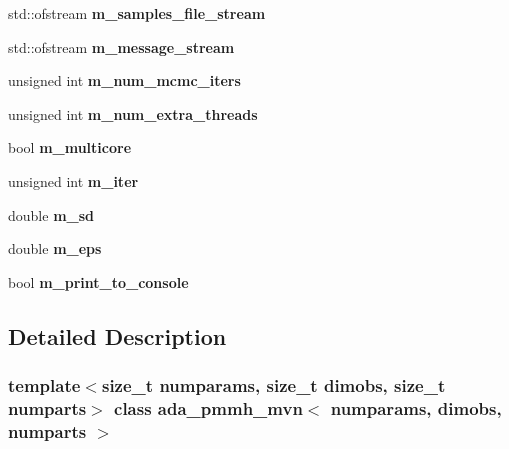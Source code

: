 \begin{DoxyCompactItemize}
\mbox{\label{classada__pmmh__mvn_ac8db545c9725213921bd4db1592d52f5}} 
std\+::ofstream {\bfseries m\+\_\+samples\+\_\+file\+\_\+stream}
\item 
\mbox{\label{classada__pmmh__mvn_a342db33e2e488aeefd818db9ad88b7c0}} 
std\+::ofstream {\bfseries m\+\_\+message\+\_\+stream}
\item 
\mbox{\label{classada__pmmh__mvn_afa1052465ed3881ee73427e2dcefcad4}} 
unsigned int {\bfseries m\+\_\+num\+\_\+mcmc\+\_\+iters}
\item 
\mbox{\label{classada__pmmh__mvn_ad6d00a88a8f8c21cedb17dc191b8180b}} 
unsigned int {\bfseries m\+\_\+num\+\_\+extra\+\_\+threads}
\item 
\mbox{\label{classada__pmmh__mvn_a0f2d20b6d51017ab6ee1c01e130f3da5}} 
bool {\bfseries m\+\_\+multicore}
\item 
\mbox{\label{classada__pmmh__mvn_a373ba09d8097827060ac773cd008684e}} 
unsigned int {\bfseries m\+\_\+iter}
\item 
\mbox{\label{classada__pmmh__mvn_aa1a988af0305a7baff3a15cc3a12f8cf}} 
double {\bfseries m\+\_\+sd}
\item 
\mbox{\label{classada__pmmh__mvn_a94301c74a280baa8194a5d5e0e178973}} 
double {\bfseries m\+\_\+eps}
\item 
\mbox{\label{classada__pmmh__mvn_a406b2c36419506202f9d607ae8acf46a}} 
bool {\bfseries m\+\_\+print\+\_\+to\+\_\+console}
\end{DoxyCompactItemize}


\subsection{Detailed Description}
\subsubsection*{template$<$size\+\_\+t numparams, size\+\_\+t dimobs, size\+\_\+t numparts$>$\newline
class ada\+\_\+pmmh\+\_\+mvn$<$ numparams, dimobs, numparts $>$}

